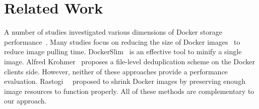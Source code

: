 \section{Related Work}
\label{sec:related}


A number of studies investigated various dimensions of Docker storage
performance~\cite{dockerssd,shifter,slacker,exoclones,docker-driver-eval,improve-cow-container-drivers,cntr,dockerworkload}.
%
Many studies focus on reducing the size of Docker
images~\cite{rastogi2017cimplifier,gschwind2017optimizing} to reduce image
pulling time.
%
DockerSlim~\cite{dockerslim} is an effective tool to minify a
single image.
%
Alfred Krohmer~\cite{Krohmer-proposal} proposes a file-level
deduplication scheme on the Docker clients side.
However, neither of these approaches provide a performance evaluation.
%
Rastogi~\etal~\cite{rastogi2017cimplifier} proposed to shrink Docker images by
preserving enough image resources to function properly.
%
All of these methods are complementary to our approach.
%
%
%
%
%
